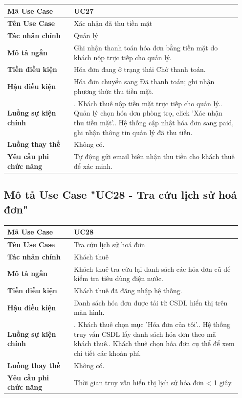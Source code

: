 \documentclass[a4paper,oneside]{report}
\begin{document}
\begin{longtable}[]{@{}>{\RaggedRight\arraybackslash}p{0.27\linewidth}>{\RaggedRight\arraybackslash}p{0.68\linewidth}@{}}
\toprule
\textbf{Mã Use Case} & UC27\tabularnewline
\midrule
\endhead
\textbf{Tên Use Case} & Xác nhận đã thu tiền mặt\tabularnewline
\textbf{Tác nhân chính} & Quản lý\tabularnewline
\textbf{Mô tả ngắn} & Ghi nhận thanh toán hóa đơn bằng tiền mặt do khách
nộp trực tiếp cho quản lý.\tabularnewline
\textbf{Tiền điều kiện} & Hóa đơn đang ở trạng thái Chờ thanh
toán.\tabularnewline
\textbf{Hậu điều kiện} & Hóa đơn chuyển sang Đã thanh toán; ghi nhận
phương thức thu tiền mặt.\tabularnewline
\textbf{Luồng sự kiện chính} & 1. Khách thuê nộp tiền
mặt trực tiếp cho quản lý.\newline 2. Quản lý chọn hóa đơn phòng
trọ, click 'Xác nhận thu tiền mặt'.\newline 3. Hệ thống cập nhật
hóa đơn sang paid, ghi nhận thông tin quản lý đã thu
tiền.\tabularnewline
\textbf{Luồng thay thế} & Không có.\tabularnewline
\textbf{Yêu cầu phi chức năng} & Tự động gửi email biên nhận thu tiền
cho khách thuê để xác minh.\tabularnewline
\bottomrule
\end{longtable}

\subsection{Mô tả Use Case "UC28 - Tra cứu lịch sử hoá đơn"}

\begin{longtable}[]{@{}>{\RaggedRight\arraybackslash}p{0.27\linewidth}>{\RaggedRight\arraybackslash}p{0.68\linewidth}@{}}
\toprule
\textbf{Mã Use Case} & UC28\tabularnewline
\midrule
\endhead
\textbf{Tên Use Case} & Tra cứu lịch sử hoá đơn\tabularnewline
\textbf{Tác nhân chính} & Khách thuê\tabularnewline
\textbf{Mô tả ngắn} & Khách thuê tra cứu lại danh sách các hóa đơn cũ để
kiểm tra tiêu dùng điện nước.\tabularnewline
\textbf{Tiền điều kiện} & Khách thuê đã đăng nhập hệ
thống.\tabularnewline
\textbf{Hậu điều kiện} & Danh sách hóa đơn được tải từ CSDL hiển thị
trên màn hình.\tabularnewline
\textbf{Luồng sự kiện chính} & 1. Khách thuê chọn mục
'Hóa đơn của tôi'.\newline 2. Hệ thống truy vấn CSDL lấy danh sách
hóa đơn theo mã khách thuê.\newline 3. Khách thuê chọn hóa đơn cụ
thể để xem chi tiết các khoản phí.\tabularnewline
\textbf{Luồng thay thế} & Không có.\tabularnewline
\textbf{Yêu cầu phi chức năng} & Thời gian truy vấn hiển thị lịch sử hóa
đơn \textless{} 1 giây.\tabularnewline
\bottomrule
\end{longtable}
\end{document}
